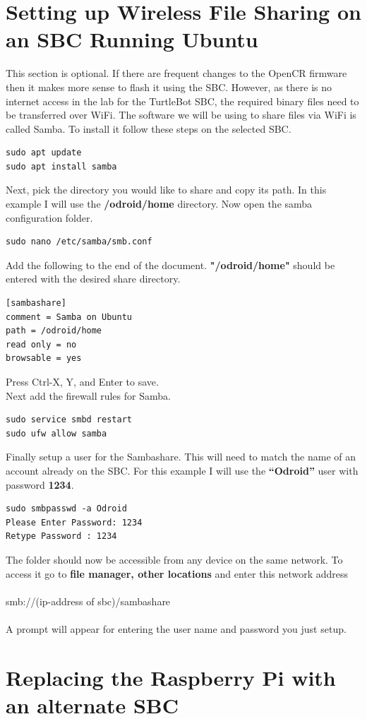 \documentclass[12]{article}
\begin{document}
\section{Setting up Wireless File Sharing on an SBC Running Ubuntu}
This section is optional. If there are frequent changes to the OpenCR firmware then it makes more sense to flash it using the SBC. However, as there is no internet access in the lab for the TurtleBot SBC, the required binary files need to be transferred over WiFi. The software we will be using to share files via WiFi is called Samba. To install it follow these steps on the selected SBC.
\begin{lstlisting}
sudo apt update
sudo apt install samba
\end{lstlisting}
Next, pick the directory you would like to share and copy its path. In this example I will use the \textbf{/odroid/home} directory.
Now open the samba configuration folder. 
\begin{lstlisting}
sudo nano /etc/samba/smb.conf
\end{lstlisting}
Add the following to the end of the document. \textbf{"/odroid/home"} should be entered with the desired share directory.
\begin{lstlisting}
[sambashare]
comment = Samba on Ubuntu
path = /odroid/home
read only = no
browsable = yes
\end{lstlisting}
Press Ctrl-X, Y, and Enter to save.\\
Next add the firewall rules for Samba.
\begin{lstlisting}
sudo service smbd restart
sudo ufw allow samba
\end{lstlisting}
Finally setup a user for the Sambashare. This will need to match the name of an account already on the SBC. For this example I will use the \textbf{“Odroid”} user with password \textbf{1234}.
\begin{lstlisting}
sudo smbpasswd -a Odroid
Please Enter Password: 1234
Retype Password : 1234
\end{lstlisting}
The folder should now be accessible from any device on the same network. To access it go to \textbf{file manager, other locations} and enter this network address\\\\
smb://(ip-address of sbc)/sambashare\\\\
A prompt will appear for entering the user name and password you just setup.
\newpage
\section{Replacing the Raspberry Pi with an alternate SBC}
\end{document}
